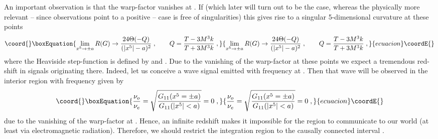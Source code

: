 \documentclass[a4paper,12pt]{article}
\begin{document}
An important observation is that the warp-factor \coordHE{}
vanishes at \coordHE{}. If \coordHE{} (which later will turn out to be the
\coordHE{} case, whereas the physically more relevant -- since
observations point to a positive \coordHE{} -- \coordHE{} case is
free of singularities) this gives rise to a singular
5-dimensional curvature at these points
\begin{equation}\coord{}\boxEquation{
  \lim_{x^5 \rightarrow \pm a} R(G) 
  \rightarrow
    \frac{24\Theta(-Q)}{(|x^5|-a)^2}   
    \; , \qquad
    Q = \frac{T-3M^3 k}{T+3M^3 k}
    \; ,
}{
  \lim_{x^5 \rightarrow \pm a} R(G) 
  \rightarrow
    \frac{24\Theta(-Q)}{(|x^5|-a)^2}   
    \; , \qquad
    Q = \frac{T-3M^3 k}{T+3M^3 k}
    \; ,
}{ecuacion}\coordE{}\end{equation}
where the Heaviside step-function is defined by \coordHE{} and
\coordHE{}. Due to the vanishing of the warp-factor at these
points we expect a tremendous red-shift in signals originating
there. Indeed, let us conceive a wave signal emitted with frequency
\coordHE{} at \coordHE{}. Then that wave will be observed in the
interior region \coordHE{} with frequency \coordHE{} given by
\begin{equation}\coord{}\boxEquation{
  \frac{\nu_o}{\nu_e} = \sqrt{\frac{G_{11}(x^5=\pm a)}{G_{11}(|x^5|<a)}}
                      = 0 \; ,
}{
  \frac{\nu_o}{\nu_e} = \sqrt{\frac{G_{11}(x^5=\pm a)}{G_{11}(|x^5|<a)}}
                      = 0 \; ,
}{ecuacion}\coordE{}\end{equation}
due to the vanishing of the warp-factor at \coordHE{}. Hence, an infinite
redshift makes it impossible for the region \coordHE{} to communicate to our
world (at least via electromagnetic radiation). Therefore, we should restrict
the \coordHE{} integration region to the causally connected interval \coordHE{}.
\end{document}
